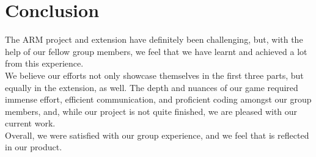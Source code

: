 \documentclass[11pt]{article}
\begin{document}
\section{Conclusion}

The ARM project and extension have definitely been challenging, but, with the help of our fellow group members, we feel that we have learnt and achieved a lot from this experience.
\\
We believe our efforts not only showcase themselves in the first three parts, but equally in the extension, as well. The depth and nuances of our game required immense effort, efficient communication, and proficient coding amongst our group members, and, while our project is not quite finished, we are pleased with our current work.
\\
Overall, we were satisfied with our group experience, and we feel that is reflected in our product.
\end{document}
